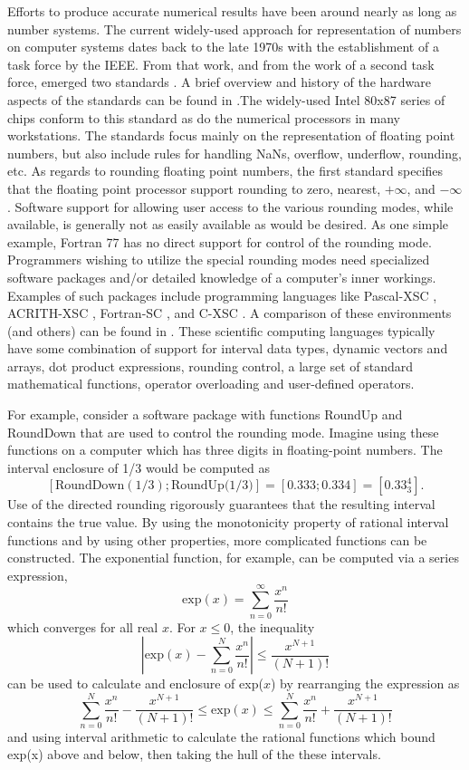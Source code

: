 Efforts to produce accurate numerical results have been around nearly as long
as  number systems. The current widely-used approach for representation of
numbers on computer systems dates back to the late 1970s with the
establishment of a task force by the IEEE. From that work, and from the work
of a second task force, emerged two standards \cite{ANSI85, ANSI87}. A brief
overview and history of the hardware aspects of the standards can be found in
\cite{Cody88}.The widely-used Intel 80x87 series of chips conform to this
standard as do the numerical processors in many workstations. The standards
focus mainly on the representation of floating point numbers, but also include
rules for handling NaNs, overflow, underflow, rounding, etc. As regards to
rounding floating point numbers, the first standard \cite{ANSI85} specifies
that the floating point processor support rounding to zero, nearest,
$+\infty$, and $-\infty$.  Software support for allowing user access to the
various rounding modes, while available, is generally not as easily available
as would be desired. As one simple example, Fortran 77 has no direct support
for control of the rounding mode. Programmers wishing to utilize the special
rounding modes need specialized software packages and/or detailed knowledge of
a computer's inner workings. Examples of such packages include programming
languages like Pascal-XSC \cite{Hammer93}, ACRITH-XSC \cite{Walter93},
Fortran-SC \cite{Walter88,Metzger88}, and C-XSC \cite{Lawo93}. A comparison of
these environments (and others) can be found in \cite{Kea96b}. These
scientific computing languages typically have some combination of support for
interval data types, dynamic vectors and arrays, dot product expressions,
rounding control, a large set of standard mathematical functions, operator
overloading and user-defined operators.  

For example, consider a software package with functions RoundUp and RoundDown 
that are used to control the rounding mode. Imagine using these functions on a
computer which has three digits in floating-point numbers. The interval
enclosure of 1/3  
would be computed as 
$$[\mbox{RoundDown}(1/3); \mbox{RoundUp(1/3)}] 
= [0.333; 0.334] = [0.33^4_3 ].
$$
Use of the directed rounding rigorously guarantees that the resulting interval
contains the true value. By using the monotonicity property of rational
interval functions and by using other properties, more complicated functions
can be constructed. The exponential function, for example, can be computed via
a series expression,  
$$
\mbox{exp}(x) = \sum_{n=0}^\infty\frac{x^n}{n!}
$$
which converges for all real 
$x$. For $x \leq 0$, the inequality 
$$
\left| \mbox{exp}(x) -\sum_{n=0}^N \frac{x^n}{n!} \right| \leq \frac{x^{N+1}}{(N+1)!}
$$
can be used to calculate and enclosure of exp($x$) by rearranging the
expression as  
$$
\sum_{n=0}^N \frac{x^n}{n!} - \frac{x^{N+1}}{(N+1)!} \leq
\mbox{exp}(x) \leq
\sum_{n=0}^N \frac{x^n}{n!} + \frac{x^{N+1}}{(N+1)!}
$$
and using interval arithmetic to calculate the rational functions which bound
exp(x) above and below, then taking the hull of the these intervals. 

